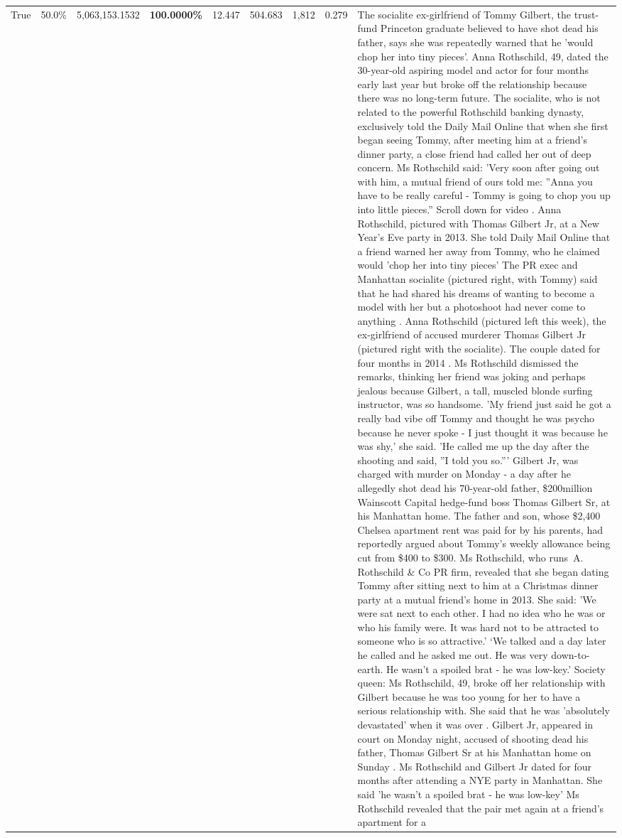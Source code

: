 \begin{table}[H]
\begin{tabular}{lllrlllll}
True & 50.0\% & 5,063,153.1532 & \bfseries \color{red} 100.0000\% & 12.447 & 504.683 & 1,812 & 0.279 & The socialite ex-girlfriend of Tommy Gilbert, the trust-fund Princeton graduate believed to have shot dead his father, says she was repeatedly warned that he 'would chop her into tiny pieces'. Anna Rothschild, 49, dated the 30-year-old aspiring model and actor for four months early last year but broke off the relationship because there was no long-term future. The socialite, who is not related to the powerful Rothschild banking dynasty, exclusively told the Daily Mail Online that when she first began seeing Tommy, after meeting him at a friend's dinner party, a close friend had called her out of deep concern. Ms Rothschild said: 'Very soon after going out with him, a mutual friend of ours told me: ''Anna you have to be really careful - Tommy is going to chop you up into little pieces.'' Scroll down for video . Anna Rothschild, pictured with Thomas Gilbert Jr, at a New Year's Eve party in 2013. She told Daily Mail Online that a friend warned her away from Tommy, who he claimed would 'chop her into tiny pieces' The PR exec and Manhattan socialite (pictured right, with Tommy) said that he had shared his dreams of wanting to become a model with her but a photoshoot had never come to anything . Anna Rothschild (pictured left this week), the ex-girlfriend of accused murderer Thomas Gilbert Jr (pictured right with the socialite). The couple dated for four months in 2014 . Ms Rothschild dismissed the remarks, thinking her friend was joking and perhaps jealous because Gilbert, a tall, muscled blonde surfing instructor, was so handsome. 'My friend just said he got a really bad vibe off Tommy and thought he was psycho because he never spoke - I just thought it was because he was shy,' she said. 'He called me up the day after the shooting and said, ''I told you so.''' Gilbert Jr, was charged with murder on Monday - a day after he allegedly shot dead his 70-year-old father, \$200million Wainscott Capital hedge-fund boss Thomas Gilbert Sr, at his Manhattan home. The father and son, whose \$2,400 Chelsea apartment rent was paid for by his parents, had reportedly argued about Tommy's weekly allowance being cut from \$400 to \$300. Ms Rothschild, who runs A. Rothschild \& Co PR firm, revealed that she began dating Tommy after sitting next to him at a Christmas dinner party at a mutual friend's home in 2013. She said: 'We were sat next to each other. I had no idea who he was or who his family were. It was hard not to be attracted to someone who is so attractive.' ‘We talked and a day later he called and he asked me out. He was very down-to-earth. He wasn’t a spoiled brat - he was low-key.’ Society queen: Ms Rothschild, 49, broke off her relationship with Gilbert because he was too young for her to have a serious relationship with. She said that he was 'absolutely devastated' when it was over . Gilbert Jr, appeared in court on Monday night, accused of shooting dead his father, Thomas Gilbert Sr at his Manhattan home on Sunday . Ms Rothschild and Gilbert Jr dated for four months after attending a NYE party in Manhattan. She said 'he wasn't a spoiled brat - he was low-key' Ms Rothschild revealed that the pair met again at a friend’s apartment for a 
\end{tabular}
\end{table}
